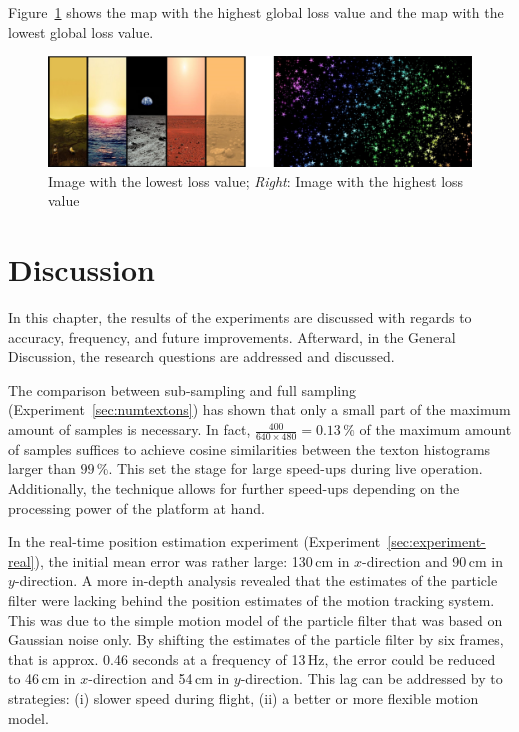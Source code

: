 \documentclass[11pt]{report}
\begin{document}
Figure~\ref{fig:minmaximg} shows the map with the highest global loss
value and the map with the lowest global loss value.

\begin{figure}[h!]
\begin{center}
\includegraphics[width=0.7\columnwidth]{lowest_highest}
\caption{{\label{fig:minmaximg}
Image with the lowest loss value; \emph{Right}:
    Image with the highest loss value%
}}
\end{center}
\end{figure}

\chapter{Discussion}
\label{chap:discussion}

In this chapter, the results of the experiments are discussed with
regards to accuracy, frequency, and future improvements. Afterward, in
the General Discussion, the research questions are addressed and
discussed.

The comparison between sub-sampling and full sampling
(Experiment~\ref{sec:numtextons}) has shown that only a small part of
the maximum amount of samples is necessary. In fact,
$\frac{400}{640 \times 480} = 0.13\,\%$ of the maximum amount of
samples suffices to achieve cosine similarities between the texton
histograms larger than $99\,\%$. This set the stage for large
speed-ups during live operation. Additionally, the technique allows
for further speed-ups depending on the processing power of the
platform at hand.

In the real-time position estimation experiment
(Experiment~\ref{sec:experiment-real}), the initial mean error
was rather large: 130\,cm in $x$-direction and 90\,cm in
$y$-direction. A more in-depth analysis revealed that the estimates of
the particle filter were lacking behind the position estimates of the
motion tracking system. This was due to the simple motion model of the
particle filter that was based on Gaussian noise only. By shifting the
estimates of the particle filter by six frames, that is approx. 0.46
seconds at a frequency of 13\,Hz, the error could be reduced to 46\,cm
in $x$-direction and 54\,cm in $y$-direction. This lag can be
addressed by to strategies: (i) slower speed during flight, (ii) a
better or more flexible motion model.
\end{document}
